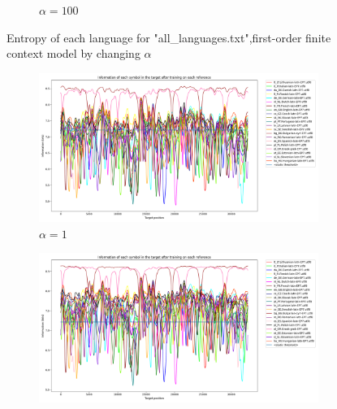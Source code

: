 \documentclass{article}
\begin{document}
\begin{figure}
\begin{subfigure}[b]{0.3\textwidth}
\begin{center}
        \end{center}
        \caption{$\alpha = 100$}
        \label{fig:all_languages_p_c:100:3}
    \end{subfigure}
    
    \caption{Entropy of each language for "all_languages.txt",first-order finite context model by changing $\alpha$}
    \label{fig:all_languages_p_c:alpha}
\end{figure}

\begin{figure}
    \begin{subfigure}[b]{0.3\textwidth}
        \begin{center}
            \includegraphics[width=1.0\linewidth]{../results/all_languages_random/-p_c:1:3.png}
        \end{center}
        \caption{$\alpha = 1$}
        \label{fig:all_languages_random_p_c:1:3_again}
    \end{subfigure}
    \hfill
    \begin{subfigure}[b]{0.3\textwidth}
        \begin{center}
            \includegraphics[width=1.0\linewidth]{../results/all_languages_random/-p_c:10:3.png}

\end{center}
\end{subfigure}
\end{figure}
\end{document}
